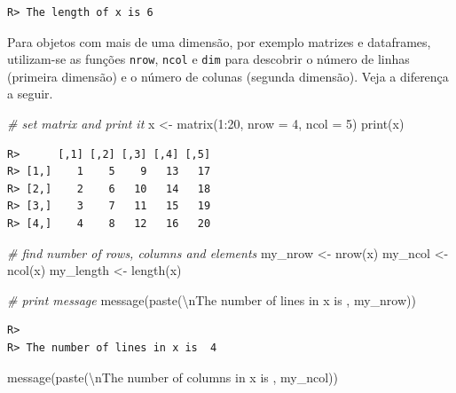 \documentclass[
  11pt,
]{book}
\newenvironment{Shaded}{\begin{snugshade}}{\end{snugshade}}
\newcommand{\AttributeTok}[1]{\textcolor[rgb]{0.61,0.61,0.61}{#1}}
\newcommand{\CommentTok}[1]{\textcolor[rgb]{0.37,0.37,0.37}{\textit{#1}}}
\newcommand{\DecValTok}[1]{\textcolor[rgb]{0.06,0.06,0.06}{#1}}
\newcommand{\FunctionTok}[1]{\textcolor[rgb]{0,0,0}{#1}}
\newcommand{\NormalTok}[1]{#1}
\newcommand{\OtherTok}[1]{\textcolor[rgb]{0.37,0.37,0.37}{#1}}
\newcommand{\SpecialCharTok}[1]{\textcolor[rgb]{0,0,0}{#1}}
\newcommand{\StringTok}[1]{\textcolor[rgb]{0.5,0.5,0.5}{#1}}
\begin{document}
\begin{verbatim}
R> The length of x is 6
\end{verbatim}

Para objetos com mais de uma dimensão, por exemplo matrizes e dataframes, utilizam-se as funções \texttt{nrow}, \texttt{ncol} e \texttt{dim} para descobrir o número de linhas (primeira dimensão) e o número de colunas (segunda dimensão). Veja a diferença a seguir.

\begin{Shaded}
\begin{Highlighting}[]
\CommentTok{\# set matrix and print it}
\NormalTok{x }\OtherTok{\textless{}{-}} \FunctionTok{matrix}\NormalTok{(}\DecValTok{1}\SpecialCharTok{:}\DecValTok{20}\NormalTok{, }\AttributeTok{nrow =} \DecValTok{4}\NormalTok{, }\AttributeTok{ncol =} \DecValTok{5}\NormalTok{)}
\FunctionTok{print}\NormalTok{(x)}
\end{Highlighting}
\end{Shaded}

\begin{verbatim}
R>      [,1] [,2] [,3] [,4] [,5]
R> [1,]    1    5    9   13   17
R> [2,]    2    6   10   14   18
R> [3,]    3    7   11   15   19
R> [4,]    4    8   12   16   20
\end{verbatim}

\begin{Shaded}
\begin{Highlighting}[]
\CommentTok{\# find number of rows, columns and elements}
\NormalTok{my\_nrow }\OtherTok{\textless{}{-}} \FunctionTok{nrow}\NormalTok{(x)}
\NormalTok{my\_ncol }\OtherTok{\textless{}{-}} \FunctionTok{ncol}\NormalTok{(x)}
\NormalTok{my\_length }\OtherTok{\textless{}{-}} \FunctionTok{length}\NormalTok{(x)}

\CommentTok{\# print message}
\FunctionTok{message}\NormalTok{(}\FunctionTok{paste}\NormalTok{(}\StringTok{\textquotesingle{}}\SpecialCharTok{\textbackslash{}n}\StringTok{The number of lines in x is \textquotesingle{}}\NormalTok{, my\_nrow))}
\end{Highlighting}
\end{Shaded}

\begin{verbatim}
R> 
R> The number of lines in x is  4
\end{verbatim}

\begin{Shaded}
\begin{Highlighting}[]
\FunctionTok{message}\NormalTok{(}\FunctionTok{paste}\NormalTok{(}\StringTok{\textquotesingle{}}\SpecialCharTok{\textbackslash{}n}\StringTok{The number of columns in x is \textquotesingle{}}\NormalTok{, my\_ncol))}
\end{Highlighting}
\end{Shaded}
\end{document}
